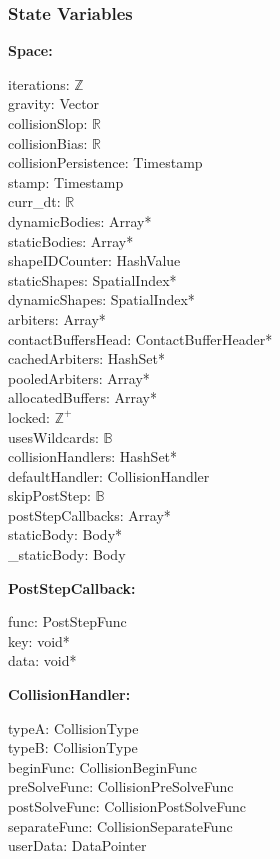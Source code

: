 \documentclass[12pt]{article}
\newcommand{\B}{$\mathbb{B}$}
\newcommand{\R}{$\mathbb{R}$}
\newcommand{\Z}{$\mathbb{Z}$}
\newcommand{\UZ}{$\mathbb{Z}^+$}
\begin{document}
\subsubsection{State Variables} \label{SecSVSpace}
	\textbf{Space:} 
	\begin{multicols}{2}
		\noindent iterations: \Z \\
		gravity: Vector \\
		collisionSlop: \R \\
		collisionBias: \R \\
		collisionPersistence: Timestamp \\
		stamp: Timestamp \\
		curr_dt: \R \\
		dynamicBodies: Array* \\
		staticBodies: Array* \\
		shapeIDCounter: HashValue \\
		staticShapes: SpatialIndex* \\
		dynamicShapes: SpatialIndex* \\
		arbiters: Array* \\
		contactBuffersHead: ContactBufferHeader* \\
		cachedArbiters: HashSet* \\
		pooledArbiters: Array* \\
		allocatedBuffers: Array* \\
		locked: \UZ \\
		usesWildcards: \B \\
		collisionHandlers: HashSet* \\
		defaultHandler: CollisionHandler \\
		skipPostStep: \B \\
		postStepCallbacks: Array* \\
		staticBody: Body* \\
		_staticBody: Body 
	\end{multicols}

	\noindent \textbf{PostStepCallback:}
	\begin{multicols}{3}
		\noindent func: PostStepFunc \\
		key: void* \\
		data: void* 
	\end{multicols}
	
	\noindent \textbf{CollisionHandler:}
	\begin{multicols}{3}
		\noindent typeA: CollisionType \\
		typeB: CollisionType \\
		beginFunc: CollisionBeginFunc \\
		preSolveFunc: CollisionPreSolveFunc \\
		postSolveFunc: CollisionPostSolveFunc \\
		separateFunc: CollisionSeparateFunc \\
		userData: DataPointer
	\end{multicols}
	
\end{document}
